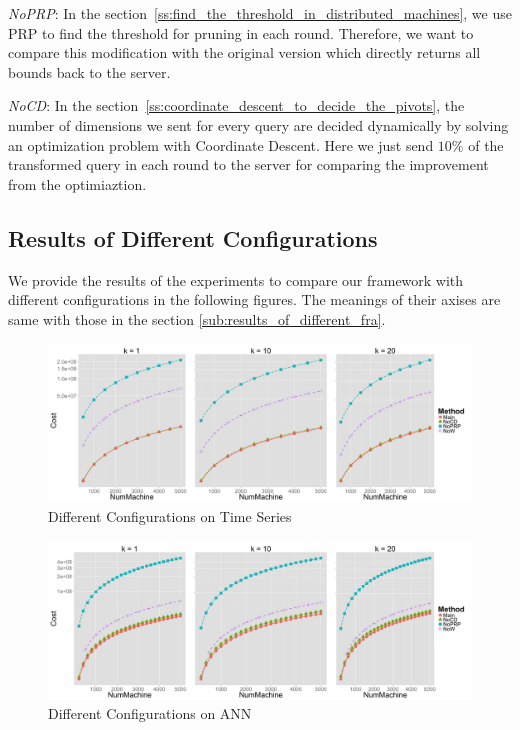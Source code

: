\emph{NoPRP}: In the section~\ref{ss:find_the_threshold_in_distributed_machines}, we use PRP to find the threshold for pruning in each round.  Therefore, we want to compare this modification with the original version which directly returns all bounds back to the server.

\emph{NoCD}: In the section~\ref{ss:coordinate_descent_to_decide_the_pivots}, the number of dimensions we sent for every query are decided dynamically by solving an optimization problem with Coordinate Descent.  Here we just send $10\%$ of the transformed query in each round to the server for comparing the improvement from the optimiaztion.


\subsection{Results of Different Configurations} %
\label{sub:results_of_different_configurations}


We provide the results of the experiments to compare our framework with different configurations in the following figures. The meanings of their axises are same with those in the section \ref{sub:results_of_different_fra}.

\begin{figure}[htpb!]
  \centering
  \includegraphics[width=1.0\linewidth]{exp/in/time.png}
  \caption{Different Configurations on Time Series}
  \label{fig:in_time}
\end{figure}

\begin{figure}[htpb!]
  \centering
  \includegraphics[width=1.0\linewidth]{exp/in/ANN.png}
  \caption{Different Configurations on ANN}
  \label{fig:in_ANN}
\end{figure}

